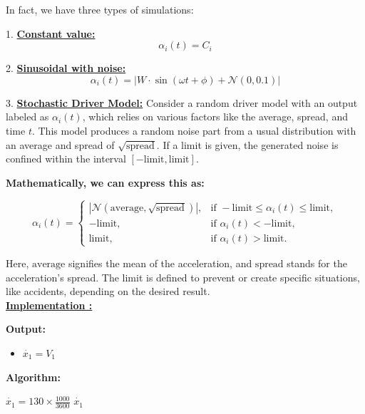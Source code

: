 \documentclass{article}
\begin{document}
			In fact, we have three types of simulations:
			
			1. \textbf{\underline{Constant value:}}
			\[
			\alpha_i(t) = C_i
			\]
			
			2. \textbf{\underline{Sinusoidal with noise:}}
			\[
			\alpha_i(t) = \left| W \cdot \sin(\omega t + \phi) + \mathcal{N}(0, 0.1) \right|
			\]
			
			3. \textbf{\underline{Stochastic Driver Model:}} \newline \newline
			Consider a random driver model with an output labeled as \( \alpha_i(t) \), which relies on various factors like the average, spread, and time \( t \). This model produces a random noise part from a usual distribution with an average and spread of \( \sqrt{\text{spread}} \). If a limit is given, the generated noise is confined within the interval \([- \text{limit}, \text{limit}]\). \newline \newline
			
			\textbf{Mathematically, we can express this as:}
		
			
			\[
			\alpha_i(t) =
			\begin{cases}
				\left| \mathcal{N}(\text{average}, \sqrt{\text{spread}}) \right|, & \text{if } -\text{limit} \leq \alpha_i(t) \leq \text{limit}, \\
				-\text{limit}, & \text{if } \alpha_i(t) < -\text{limit}, \\
				\text{limit}, & \text{if } \alpha_i(t) > \text{limit}.
			\end{cases}
			\]
			
			Here, \( \text{average} \) signifies the mean of the acceleration, and \( \text{spread} \) stands for the acceleration's spread. The limit is defined to prevent or create specific situations, like accidents, depending on the desired result. \\
			
			
			\textbf{\underline{Implementation : }}
			
			\begin{algorithm}[H]
				\caption{$\dot{x_1}$}\label{alg:x1_dot}
				\begin{algorithmic}
					\State \textbf{Output:} \\
					\begin{itemize}[]
						\item $\dot{x_1}=V_1$
					\end{itemize}
					\State \textbf{Algorithm:} \\
					\begin{itemize}[]
						\State $\dot{x_1}=130 \times \frac{1000}{3600}$ 
						\State \Return $\dot{x_1}$ 
					\end{itemize}		
				\end{algorithmic}
			\end{algorithm}
			
\end{document}
